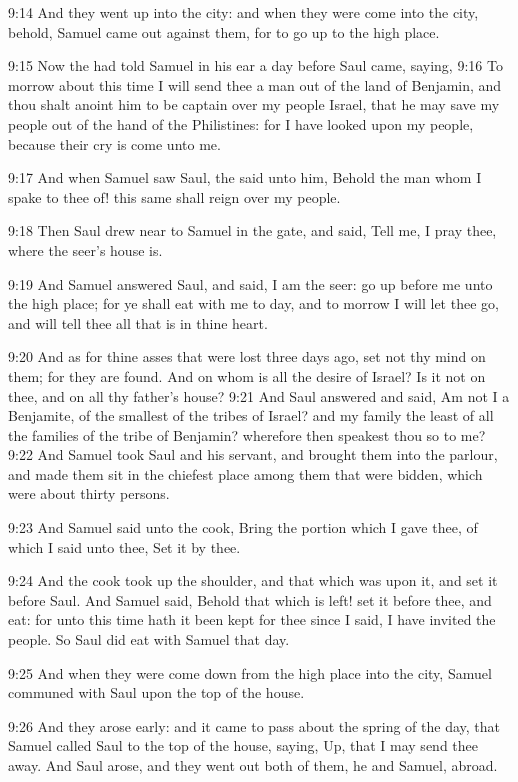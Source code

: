 9:14 And they went up into the city: and when they were come into the
city, behold, Samuel came out against them, for to go up to the high
place.

9:15 Now the \LORD had told Samuel in his ear a day before Saul came,
saying, 9:16 To morrow about this time I will send thee a man out of
the land of Benjamin, and thou shalt anoint him to be captain over my
people Israel, that he may save my people out of the hand of the
Philistines: for I have looked upon my people, because their cry is
come unto me.

9:17 And when Samuel saw Saul, the \LORD said unto him, Behold the man
whom I spake to thee of! this same shall reign over my people.

9:18 Then Saul drew near to Samuel in the gate, and said, Tell me, I
pray thee, where the seer's house is.

9:19 And Samuel answered Saul, and said, I am the seer: go up before
me unto the high place; for ye shall eat with me to day, and to morrow
I will let thee go, and will tell thee all that is in thine heart.

9:20 And as for thine asses that were lost three days ago, set not thy
mind on them; for they are found. And on whom is all the desire of
Israel? Is it not on thee, and on all thy father's house?  9:21 And
Saul answered and said, Am not I a Benjamite, of the smallest of the
tribes of Israel? and my family the least of all the families of the
tribe of Benjamin? wherefore then speakest thou so to me?  9:22 And
Samuel took Saul and his servant, and brought them into the parlour,
and made them sit in the chiefest place among them that were bidden,
which were about thirty persons.

9:23 And Samuel said unto the cook, Bring the portion which I gave
thee, of which I said unto thee, Set it by thee.

9:24 And the cook took up the shoulder, and that which was upon it,
and set it before Saul. And Samuel said, Behold that which is left!
set it before thee, and eat: for unto this time hath it been kept for
thee since I said, I have invited the people. So Saul did eat with
Samuel that day.

9:25 And when they were come down from the high place into the city,
Samuel communed with Saul upon the top of the house.

9:26 And they arose early: and it came to pass about the spring of the
day, that Samuel called Saul to the top of the house, saying, Up, that
I may send thee away. And Saul arose, and they went out both of them,
he and Samuel, abroad.

